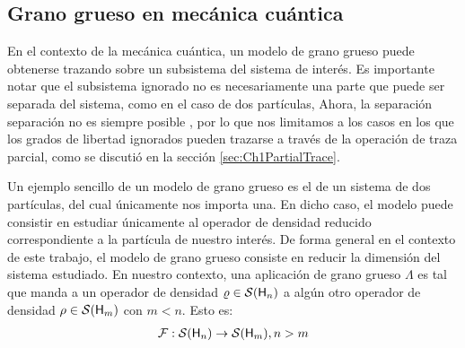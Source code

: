 \subsection{Grano grueso en mecánica cuántica}


En el contexto de la mecánica cuántica, un modelo de grano grueso puede obtenerse trazando sobre un subsistema del sistema de interés. Es importante notar que el subsistema ignorado no es necesariamente una parte que puede ser separada del sistema, como en el caso de dos partículas,  Ahora, la separación separación  no es siempre posible \cite{Macro-To-Micro}, por lo que nos limitamos a los casos en los que los grados de libertad ignorados pueden trazarse a través de la operación de traza parcial, como se discutió en la sección \ref{sec:Ch1PartialTrace}.

Un ejemplo sencillo de un modelo de grano grueso es el de un sistema de dos partículas, del cual únicamente nos importa una. En dicho caso, el modelo puede consistir en estudiar únicamente al operador de densidad reducido correspondiente a la partícula de nuestro interés. De forma general en el contexto de este trabajo, el modelo de grano grueso consiste en reducir la dimensión del sistema estudiado. En nuestro contexto, una aplicación de grano grueso $\Lambda$ es tal que manda a un operador de densidad $\varrho\in\mathcal{S}({\sf H}_{n})$ a algún otro operador de densidad $\rho\in\mathcal{S}({\sf H}_{m})$ con $m<n$. Esto es:
\begin{align}
    \mathcal{F}:\mathcal{S}({\sf H}_{n})\to \mathcal{S}({\sf H}_{m}), n>m\nonumber
\end{align}